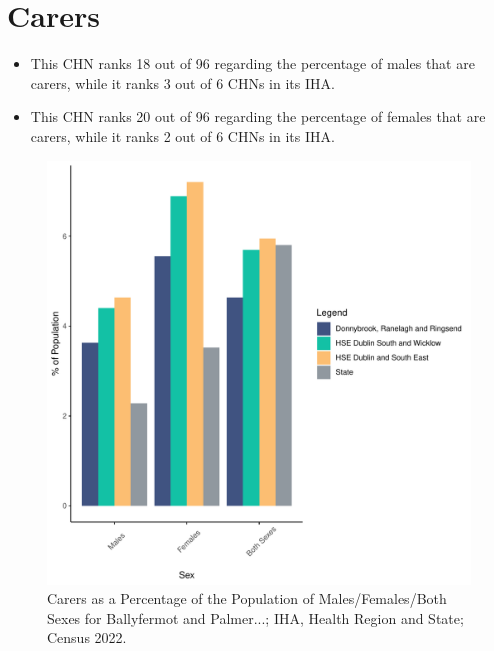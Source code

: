 \documentclass{article}
\begin{document}
\section{Carers}\label{sect:Carers}
\begin{itemize}
\item This CHN ranks  18 out of 96 regarding the percentage of males that are carers, while it ranks   3 out of 6 CHNs in its IHA.
\item This CHN ranks  20 out of 96 regarding the percentage of females that are carers, while it ranks   2 out of 6 CHNs in its IHA.
\end{itemize}
\begin{figure}[H]
	\centering
	\includegraphics[width = 150mm]{../figures/CareED.pdf}
	\caption{Carers as a Percentage of the Population of Males/Females/Both Sexes for Ballyfermot and Palmer...; IHA, Health Region and State; Census 2022.}
	\label{fig:2ae19629-1a6a-13a3-e055-000000000001}
	\end{figure}
\end{document}
